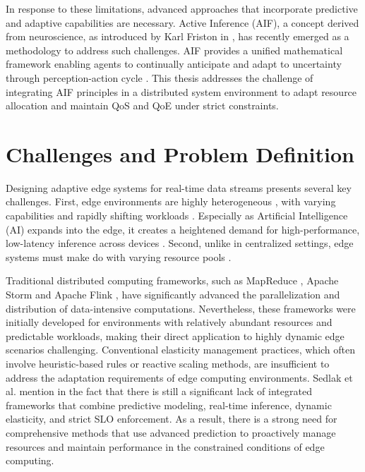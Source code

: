 In response to these limitations, advanced approaches that incorporate predictive and adaptive
capabilities are necessary. Active Inference (AIF), a concept derived from neuroscience, as introduced by Karl Friston in \cite{friston_free-energy_2010}, has recently emerged as a methodology to address such challenges. AIF provides a unified mathematical framework enabling agents to
continually anticipate and adapt to uncertainty through perception-action cycle \cite{friston_active_2016, lanillos_active_2021}. This thesis addresses the challenge of integrating AIF principles in a distributed system environment to adapt resource allocation and maintain QoS and QoE under strict constraints.

\section{Challenges and Problem Definition}
Designing adaptive edge systems for real-time data streams presents several key
challenges. First, edge environments are highly heterogeneous \cite{furst_elastic_2018}, with varying capabilities and
rapidly shifting workloads \cite{danilenka_adaptive_2025}. Especially as Artificial Intelligence (AI) expands into the edge, it creates a heightened demand for high-performance, low-latency inference across devices \cite{oquinn_environment-aware_2025}. Second, unlike in centralized settings, edge systems must make do with varying resource pools \cite{sedlak_equilibrium_2024}.

Traditional distributed computing frameworks, such as MapReduce \cite{dean_mapreduce_2008},
Apache Storm\cite{noauthor_apache_nodate} and Apache Flink \cite{noauthor_apache_nodate-1, carbone_apache_2015}, have significantly advanced the parallelization and
distribution of data-intensive computations. Nevertheless, these frameworks were initially
developed for environments with relatively abundant resources and predictable workloads,
making their direct application to highly dynamic edge scenarios challenging. Conventional elasticity management practices, which often involve heuristic-based rules or reactive scaling methods, are insufficient to address the adaptation requirements of edge computing environments. Sedlak et al. mention in \cite{sedlak_diffusing_2024} the fact that there is still a significant lack of integrated frameworks that combine predictive modeling, real-time inference, dynamic elasticity, and strict SLO enforcement. As a result, there is a strong need for comprehensive methods that use advanced prediction to proactively manage resources and maintain performance in the constrained conditions of edge computing.

